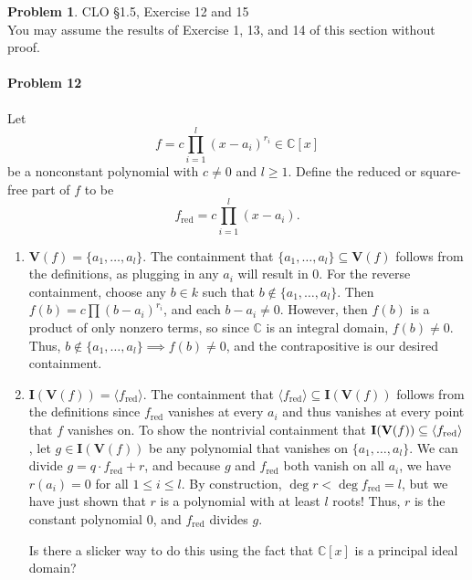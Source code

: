 \documentclass[12pt]{amsart}
\theoremstyle{definition}
\newtheorem{prob}{Problem}
\begin{document}
\begin{flushleft}
\begin{prob} CLO \S1.5, Exercise 12 and 15 \smallskip \\
You may assume the results of Exercise 1, 13, and 14 of this section without proof. 

\paragraph{Problem 12} Let \[f = c \prod_{i=1}^l(x-a_i)^{r_i} \in \mathbb C[x]\] be a nonconstant polynomial with $c \ne 0$ and $l \ge 1$. Define the reduced or square-free part of $f$ to be \[f_\text{red} = c \prod_{i=1}^l(x-a_i).\] \begin{enumerate}
    \item[a.] $\mathbf V(f) = \{a_1,\dots,a_l\}$. The containment that $\{a_1, \dots, a_l\}\subseteq \mathbf V(f)$ follows from the definitions, as plugging in any $a_i$ will result in $0$. For the reverse containment, choose any $b \in k$ such that $b \not\in \{a_1,\dots,a_l\}$. Then $f(b) = c\prod (b-a_i)^{r_i}$, and each $b-a_i \ne 0$. However, then $f(b)$ is a product of only nonzero terms, so since $\mathbb C$ is an integral domain, $f(b)\ne 0$. Thus, $b \not\in \{a_1,\dots, a_l\} \implies f(b) \ne 0$, and the contrapositive is our desired containment.
    \item[b.] $\mathbf I(\mathbf V(f)) = \langle f_\text{red}\rangle$. The containment that $\langle f_\text{red}\rangle \subseteq \mathbf I(\mathbf V(f))$ follows from the definitions since $f_\text{red}$ vanishes at every $a_i$ and thus vanishes at every point that $f$ vanishes on. To show the nontrivial containment that $\textbf I(\textbf V(f)) \subseteq \langle f_\text{red} \rangle$, let $g \in \mathbf I(\mathbf V(f))$ be any polynomial that vanishes on $\{a_1,\dots,a_l\}$. We can divide $g = q \cdot f_\text{red} + r$, and because $g$ and $f_\text{red}$ both vanish on all $a_i$, we have $r(a_i) = 0$ for all $1 \le i \le l$. By construction, $\deg r < \deg f_\text{red} = l$, but we have just shown that $r$ is a polynomial with at least $l$ roots! Thus, $r$ is the constant polynomial $0$, and $f_\text{red}$ divides $g$.

    Is there a slicker way to do this using the fact that $\mathbb C[x]$ is a principal ideal domain?
\end{enumerate}


\end{prob}
\end{flushleft}
\end{document}
